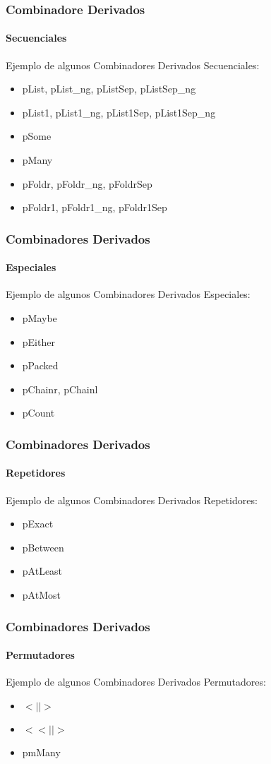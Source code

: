 \documentclass[12pt]{beamer}
\begin{document}
\begin{frame}
\frametitle{Combinadore Derivados}
\framesubtitle{Secuenciales}
Ejemplo de algunos Combinadores Derivados Secuenciales:
    \begin{itemize}
        \item pList, pList\_ng, pListSep, pListSep\_ng
        \item pList1, pList1\_ng, pList1Sep, pList1Sep\_ng
        \item pSome
        \item pMany
        \item pFoldr, pFoldr\_ng, pFoldrSep
        \item pFoldr1, pFoldr1\_ng, pFoldr1Sep
	\end{itemize}
\end{frame}

\begin{frame}
\frametitle{Combinadores Derivados}
\framesubtitle{Especiales}
Ejemplo de algunos Combinadores Derivados Especiales:
    \begin{itemize}
         \item pMaybe
         \item pEither
         \item pPacked
         \item pChainr, pChainl
         \item pCount
	\end{itemize}
\end{frame}

\begin{frame}
\frametitle{Combinadores Derivados}
\framesubtitle{Repetidores}
Ejemplo de algunos Combinadores Derivados Repetidores:
    \begin{itemize}
         \item pExact
         \item pBetween
         \item pAtLeast
         \item pAtMost
	\end{itemize}
\end{frame}

\begin{frame}
\frametitle{Combinadores Derivados}
\framesubtitle{Permutadores}
Ejemplo de algunos Combinadores Derivados Permutadores:
    \begin{itemize}
         \item $<||>$
         \item $<<||>$
         \item pmMany
	\end{itemize}
\end{frame}
\end{document}
